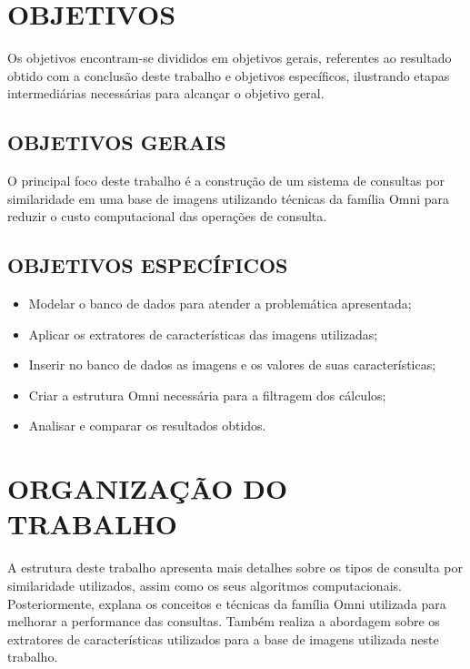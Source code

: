 \section{OBJETIVOS}
\label{sec:objetivos}
Os objetivos encontram-se divididos em objetivos gerais, referentes ao resultado obtido com a conclusão deste trabalho e objetivos específicos, ilustrando etapas intermediárias necessárias para alcançar o objetivo geral.
\subsection{OBJETIVOS GERAIS}
\label{subsec:objger}
O principal foco deste trabalho é a construção de um sistema de consultas por similaridade em uma base de imagens utilizando técnicas da família Omni para reduzir o custo computacional das operações de consulta.

\subsection{OBJETIVOS ESPECÍFICOS}
\label{subsec:objesp}
\begin{itemize}
 \item Modelar o banco de dados para atender a problemática apresentada;
 \item Aplicar os extratores de características das imagens utilizadas;
 \item Inserir no banco de dados as imagens e os valores de suas características;
 \item Criar a estrutura Omni necessária para a filtragem dos cálculos;
 \item Analisar e comparar os resultados obtidos.
\end{itemize}


\section{ORGANIZAÇÃO DO TRABALHO}
\label{sec:organizacaoTrabalho}

A estrutura deste trabalho apresenta mais detalhes sobre os tipos de consulta por similaridade utilizados, assim como os seus algoritmos computacionais. Posteriormente, explana os conceitos e técnicas da família Omni utilizada para
melhorar a performance das consultas. Também realiza a abordagem sobre os extratores de características utilizados para a base de imagens utilizada neste trabalho.
